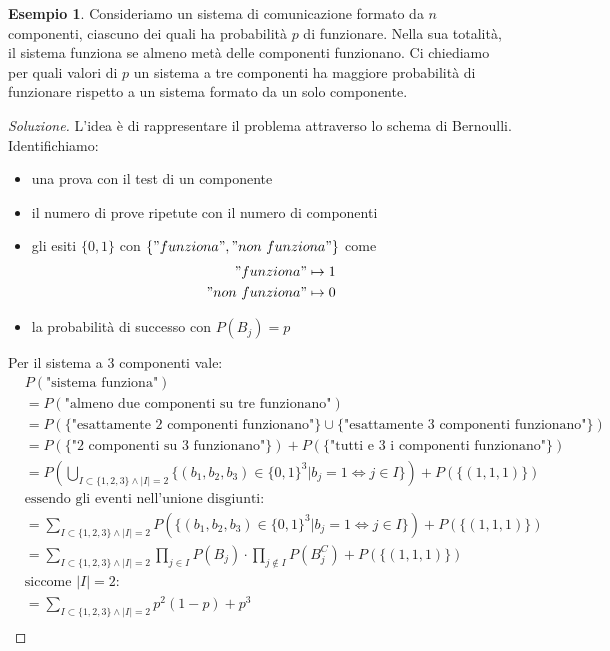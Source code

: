 \documentclass{article}
\theoremstyle{plain}
\theoremstyle{definition}
\newtheorem{esempio}{Esempio}[section]
\theoremstyle{remark}
\newenvironment{soluzione}
	{\renewcommand\qedsymbol{$\mathwitch*$}\begin{proof}[Soluzione]}
	{\end{proof}}
\renewcommand{\qedsymbol}{$\mathrightghost$}
\begin{document}
\begin{esempio}
	Consideriamo un sistema di comunicazione formato da $n$ componenti, ciascuno dei quali ha probabilità $p$ di funzionare. Nella sua totalità, il sistema funziona se almeno metà delle componenti funzionano. Ci chiediamo per quali valori di $p$ un sistema a tre componenti ha maggiore probabilità di funzionare rispetto a un sistema formato da un solo componente.
	\begin{soluzione}
		L'idea è di rappresentare il problema attraverso lo schema di Bernoulli. Identifichiamo:
		\begin{itemize}
			\item una prova con il test di un componente
			\item il numero di prove ripetute con il numero di componenti
			\item gli esiti $\{0,1\}$ con $\{"funziona","non\ funziona"\}$ come
			\begin{align*}
				"funziona"&\mapsto1\\
				"non\ funziona"&\mapsto0\\
			\end{align*}
			\item la probabilità di successo con $P(B_j)=p$
		\end{itemize}
		Per il sistema a $3$ componenti vale:
		\begin{align*}
			&P(\text{"sistema funziona"})\\
			&=P(\text{"almeno due componenti su tre funzionano"})\\
			&=P(\{\text{"esattamente 2 componenti funzionano"}\}\cup\{\text{"esattamente 3 componenti funzionano"}\})\\
			&=P(\{\text{"2 componenti su 3 funzionano"}\})+P(\{\text{"tutti e 3 i componenti funzionano"}\})\\
			&=P(\bigcup_{I\subset\{1,2,3\}\wedge \lvert I\rvert=2}\{(b_1,b_2,b_3)\in\{0,1\}^3|b_j=1\Leftrightarrow j\in I\})+P(\{(1,1,1)\})\\
			&\text{essendo gli eventi nell'unione disgiunti:}\\
			&=\sum_{I\subset\{1,2,3\}\wedge \lvert I\rvert=2}P(\{(b_1,b_2,b_3)\in\{0,1\}^3|b_j=1\Leftrightarrow j\in I\})+P(\{(1,1,1)\})\\
			&=\sum_{I\subset\{1,2,3\}\wedge \lvert I\rvert=2}\prod_{j\in I}P(B_j)\cdot\prod_{j\notin I}P(B_j^C)+P(\{(1,1,1)\})\\
			&\text{siccome }\lvert I\rvert=2\text{:}\\
			&=\sum_{I\subset\{1,2,3\}\wedge \lvert I\rvert=2}p^2 (1-p)+p^3\\

\end{align*}
\end{soluzione}
\end{esempio}
\end{document}
